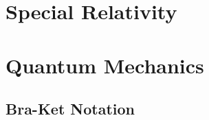 \documentclass[a4paper, titlepage]{book}
\begin{document}
\frontmatter

\tableofcontents \label{contents}

\mainmatter



\part{Special Relativity}



\part{Quantum Mechanics}




\appendix

\chapter{Bra-Ket Notation}

\backmatter

\end{document}
